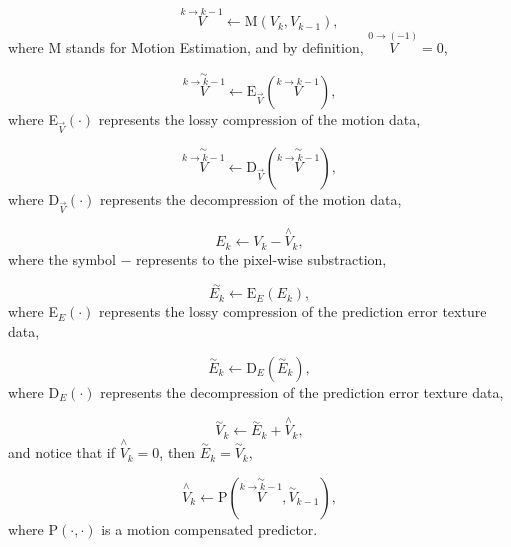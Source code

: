 \begin{equation}
  \overset{k\rightarrow k-1}{V} \leftarrow \text{M}(V_k, V_{k-1}),
  \tag{c}
\end{equation}
where M stands for Motion Estimation, and by definition,
$\overset{0\rightarrow (-1)}{V}=0$,

\begin{equation}
  \overset{\sim}{\overset{k\rightarrow k-1}{V}} \leftarrow \text{E}_{\overset{\rightarrow}{V}}(\overset{k\rightarrow k-1}{V}),
  \tag{d}
\end{equation}
where E$_{\overset{\rightarrow}{V}}(\cdot)$ represents the lossy
  compression of the motion data,

\begin{equation}
  \overset{\sim}{\overset{k\rightarrow k-1}{V}} \leftarrow \text{D}_{\overset{\rightarrow}{V}}(\overset{\sim}{\overset{k\rightarrow k-1}{V}}),
  \tag{e}
\end{equation}
where D$_{\overset{\rightarrow}{V}}(\cdot)$ represents the 
decompression of the motion data,

\begin{equation}
  E_k \leftarrow V_k - \overset{\wedge}{{V}}_k,
  \tag{f}
\end{equation}
where the symbol $-$ represents to the pixel-wise substraction,

\begin{equation}
  \overset{\sim}{E_k} \leftarrow \text{E}_{E}(E_k),
  \tag{g}
\end{equation}
where E$_{E}(\cdot)$ represents the lossy compression of the
prediction error texture data,

\begin{equation}
  \overset{\sim}{E}_k \leftarrow \text{D}_{E}(\overset{\sim}{E}_k),
  \tag{h}
\end{equation}
where D$_{E}(\cdot)$ represents the decompression of the prediction
error texture data,

\begin{equation}
  \overset{\sim}{V}_k \leftarrow \overset{\sim}{E}_k + \overset{\wedge}{V}_k,
  \tag{i}
\end{equation}
and notice that if $\overset{\wedge}{V}_k=0$, then
$\overset{\sim}{E}_k = \overset{\sim}{V}_k$,

\begin{equation}
  \overset{\wedge}{V}_k \leftarrow \text{P}(\overset{\sim}{\overset{k\rightarrow k-1}{V}}, \overset{\sim}{V}_{k-1}),
  \tag{j}
\end{equation}
where P$(\cdot,\cdot)$ is a motion compensated predictor.

